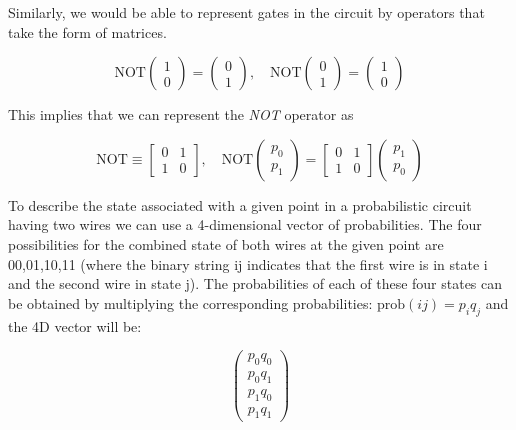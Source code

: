 \documentclass[12pt]{article}
\begin{document}
Similarly, we would be able to represent gates in the circuit by operators that take the form of matrices.

\begin{equation}
    \text{NOT} \begin{pmatrix} 1 \\ 0 \end{pmatrix} = \begin{pmatrix} 0 \\ 1 \end{pmatrix}, \quad
    \text{NOT} \begin{pmatrix} 0 \\ 1 \end{pmatrix} = \begin{pmatrix} 1 \\ 0 \end{pmatrix}
\end{equation}

This implies that we can represent the \textit{NOT} operator as

\begin{equation}
    \text{NOT} \equiv 
    \begin{bmatrix} 
    0 & 1 \\ 
    1 & 0 
    \end{bmatrix}, \quad
    \text{NOT} \begin{pmatrix} p_0 \\ p_1 \end{pmatrix} = 
    \begin{bmatrix} 0 & 1 \\ 
    1 & 0 
    \end{bmatrix} 
    \begin{pmatrix} p_1 \\ p_0 \end{pmatrix}
\end{equation}

To describe the state associated with a given point in a probabilistic circuit having two wires we can use a 4-dimensional vector of probabilities. The four possibilities for the combined state of both wires at the given point are {00,01,10,11} (where the binary string ij indicates that the first wire is in state i and the second wire in state j). The probabilities of each of these four states can be obtained by multiplying the corresponding probabilities: \(\text{prob}(ij) = p_iq_j\) and the 4D vector will be:

\begin{equation}
    \begin{pmatrix}
        p_0q_0 \\
        p_0q_1 \\
        p_1q_0 \\
        p_1q_1 
    \end{pmatrix}
\end{equation}
\end{document}
